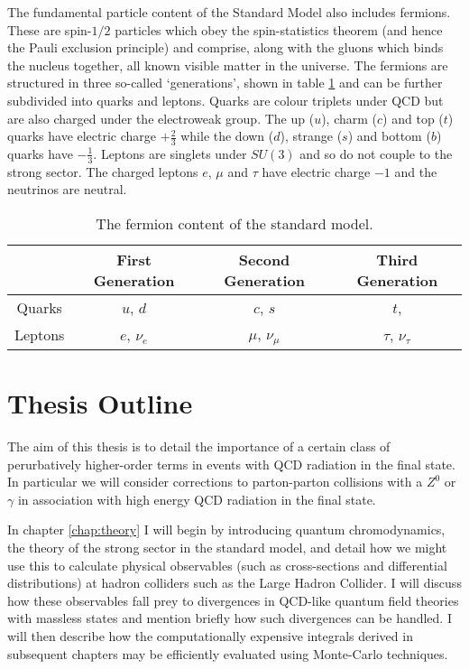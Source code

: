 	The fundamental particle content of the Standard Model also includes fermions. These are spin-$1/2$ particles which obey the spin-statistics theorem (and
	hence the Pauli exclusion principle) and comprise, along with the gluons which binds the nucleus together, all known visible matter in the universe.
	The fermions are structured in three so-called `generations', shown in table \ref{tab:fermions} and can be further subdivided into quarks and leptons.
	Quarks are colour triplets under QCD but are also charged under the electroweak group.  The up ($u$), charm ($c$) and top ($t$) quarks have electric charge
	$+\frac{2}{3}$ while the down ($d$), strange ($s$) and bottom ($b$) quarks have $-\frac{1}{3}$.
	Leptons are singlets under $SU(3)$ and so do not couple to the strong sector.  The charged leptons $e$, $\mu$ and $\tau$ have electric charge
	$-1$ and the neutrinos are neutral.

	\begin{table}[htp!]
	\begin{center}
	\begin{tabular}{c | c | c | c}
	        & First Generation & Second Generation & Third Generation   \\ \hline
	Quarks  &  $u$, $d$        & $c$, $s$          & $t$,               \\ \hline
	Leptons &  $e$, $\nu_e$    & $\mu$, $\nu_\mu$  & $\tau$, $\nu_\tau$ \\
	\end{tabular}
	\caption{The fermion content of the standard model.}
	\label{tab:fermions}
	\end{center}
	\end{table}

\section{Thesis Outline}
\label{sec:outline}

	The aim of this thesis is to detail the importance of a certain class of perurbatively higher-order terms in events with QCD radiation in the final state.  In particular
	we will consider corrections to parton-parton collisions with a $Z^0$ or $\gamma$ in association with high energy QCD radiation in the final state.

	In chapter \ref{chap:theory} I will begin by introducing quantum chromodynamics, the theory of the strong sector in the standard model, and detail how we might use this
	to calculate physical observables (such as cross-sections and differential distributions) at hadron colliders such as the Large Hadron Collider.  I will discuss how
	these observables fall prey to divergences in QCD-like quantum field theories with massless states and mention briefly how such divergences can be handled.  I will then
	describe how the computationally expensive integrals derived in subsequent chapters may be efficiently evaluated using Monte-Carlo techniques.

